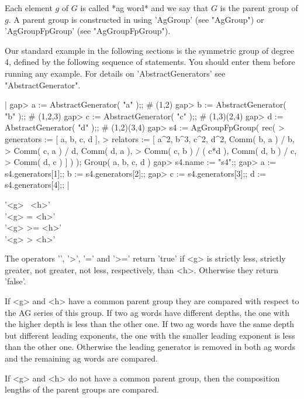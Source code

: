 Each element $g$ of $G$ is called *ag  word* and we  say  that $G$ is the
parent group of $g$.  A  parent group   is constructed in   {\GAP}  using
'AgGroup' (see "AgGroup") or 'AgGroupFpGroup' (see "AgGroupFpGroup").

Our standard example in the following sections is  the symmetric group of
degree 4, defined by  the following sequence of {\GAP}  statements.   You
should   enter  them  before running  any   example.    For  details   on
'AbstractGenerators' see "AbstractGenerator".

|    gap> a  := AbstractGenerator( "a" );;  # (1,2)
    gap> b  := AbstractGenerator( "b" );;  # (1,2,3)
    gap> c  := AbstractGenerator( "c" );;  # (1,3)(2,4)
    gap> d  := AbstractGenerator( "d" );;  # (1,2)(3,4)
    gap> s4 := AgGroupFpGroup( rec(
    >        generators := [ a, b, c, d ],
    >        relators   := [ a^2, b^3, c^2, d^2, Comm( b, a ) / b,
    >                        Comm( c, a ) / d, Comm( d, a ),
    >                        Comm( c, b ) / ( c*d ), Comm( d, b ) / c,
    >                        Comm( d, c ) ] ) );
    Group( a, b, c, d )
    gap> s4.name := "s4";;
    gap> a := s4.generators[1];; b := s4.generators[2];;
    gap> c := s4.generators[3];; d := s4.generators[4];; |

%

'<g> \<\ <h>' \\
'<g> \<= <h>' \\
'<g> >= <h>' \\
'<g> > <h>'

The operators '\<', '>', '\<=' and '>=' return  'true' if <g> is strictly
less,  strictly greater, not  greater, not less, respectively,  than <h>.
Otherwise they return 'false'.

If <g> and <h> have a common parent group they  are compared with respect
to the AG series of this group.  If  two ag words have  different depths,
the  one with the  higher depth is  less than the   other one.  If two ag
words have the same  depth but different leading  exponents, the one with
the smaller leading exponent is less  than  the other one.  Otherwise the
leading generator is removed in both ag words and  the remaining ag words
are compared.

If <g>  and <h> do  not have a common parent  group, then the composition
lengths of the parent groups are compared.


